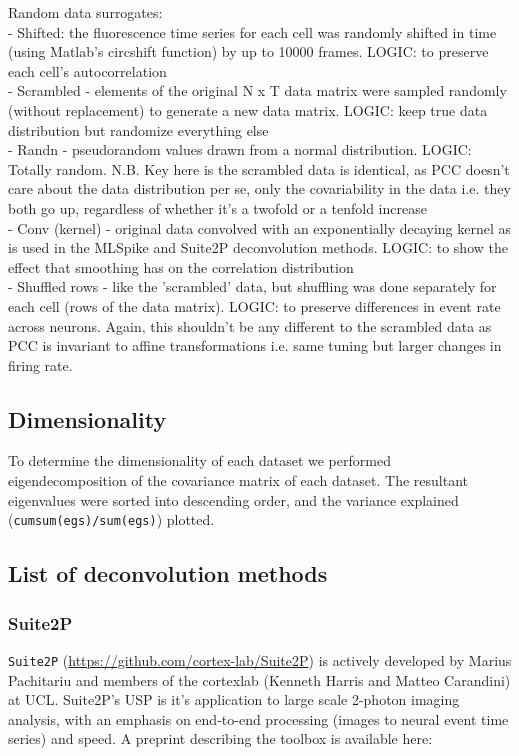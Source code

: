 \documentclass[a4paper,10pt,twocolumn]{article}
\begin{document}
Random data surrogates: \\ 
\indent - Shifted: the fluorescence time series for each cell was randomly shifted in time (using Matlab's circshift function) by up to 10000 frames. LOGIC: to preserve each cell's autocorrelation\\
\indent - Scrambled - elements of the original N x T data matrix were sampled randomly (without replacement) to generate a new data matrix. LOGIC: keep true data distribution but randomize everything else\\
\indent - Randn - pseudorandom values drawn from a normal distribution. LOGIC: Totally random. N.B. Key here is the scrambled data is identical, as PCC doesn't care about the data distribution per se, only the covariability in the data i.e. they both go up, regardless of whether it's a twofold or a tenfold increase\\
\indent - Conv (kernel) - original data convolved with an exponentially decaying kernel as is used in the MLSpike and Suite2P deconvolution methods. LOGIC: to show the effect that smoothing has on the correlation distribution \\
\indent - Shuffled rows - like the 'scrambled' data, but shuffling was done separately for each cell (rows of the data matrix). LOGIC: to preserve differences in event rate across neurons. Again, this shouldn't be any different to the scrambled data as PCC is invariant to affine transformations i.e. same tuning but larger changes in firing rate.\\


\subsection{Dimensionality}
To determine the dimensionality of each dataset we performed eigendecomposition of the covariance matrix of each dataset. The resultant eigenvalues were sorted into descending order, and the variance explained ({\tt cumsum(egs)/sum(egs)}) plotted.


\subsection*{List of deconvolution methods}
\subsubsection*{Suite2P}
\texttt{Suite2P} (\href{https://github.com/cortex-lab/Suite2P}{https://github.com/cortex-lab/Suite2P}) is actively developed by  Marius Pachitariu and members of the cortexlab (Kenneth Harris and Matteo Carandini) at UCL. Suite2P's USP is it's application to large scale 2-photon imaging analysis, with an emphasis on end-to-end processing (images to neural event time series) and speed. A preprint describing the toolbox is available here:\\
\end{document}
